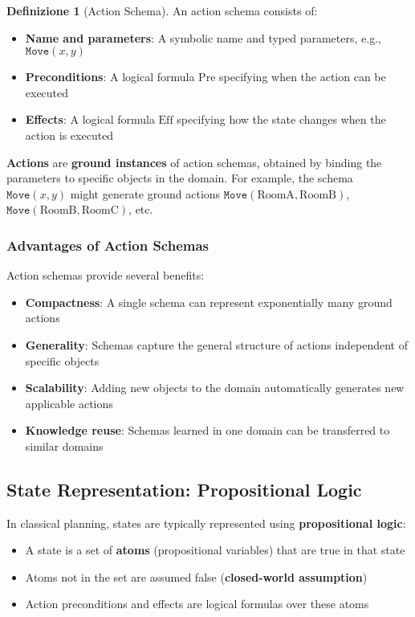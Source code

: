 \documentclass[11pt,a4paper]{article}
\theoremstyle{definition}
\newtheorem{definition}{Definizione}[section]
\theoremstyle{plain}
\theoremstyle{remark}
\begin{document}
\begin{definition}[Action Schema]
An action schema consists of:
\begin{itemize}
    \item \textbf{Name and parameters}: A symbolic name and typed parameters, e.g., $\texttt{Move}(x, y)$
    \item \textbf{Preconditions}: A logical formula $\text{Pre}$ specifying when the action can be executed
    \item \textbf{Effects}: A logical formula $\text{Eff}$ specifying how the state changes when the action is executed
\end{itemize}
\end{definition}

\textbf{Actions} are \textbf{ground instances} of action schemas, obtained by binding the parameters to specific objects in the domain. For example, the schema $\texttt{Move}(x, y)$ might generate ground actions $\texttt{Move}(\text{RoomA}, \text{RoomB})$, $\texttt{Move}(\text{RoomB}, \text{RoomC})$, etc.

\subsubsection{Advantages of Action Schemas}

Action schemas provide several benefits:

\begin{itemize}
    \item \textbf{Compactness}: A single schema can represent exponentially many ground actions
    \item \textbf{Generality}: Schemas capture the general structure of actions independent of specific objects
    \item \textbf{Scalability}: Adding new objects to the domain automatically generates new applicable actions
    \item \textbf{Knowledge reuse}: Schemas learned in one domain can be transferred to similar domains
\end{itemize}

\subsection{State Representation: Propositional Logic}

In classical planning, states are typically represented using \textbf{propositional logic}:

\begin{itemize}
    \item A state is a set of \textbf{atoms} (propositional variables) that are true in that state
    \item Atoms not in the set are assumed false (\textbf{closed-world assumption})
    \item Action preconditions and effects are logical formulas over these atoms
\end{itemize}
\end{document}
